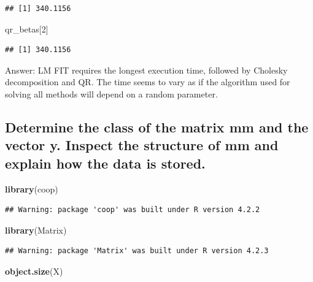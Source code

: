 \documentclass[
]{article}
\newenvironment{Shaded}{\begin{snugshade}}{\end{snugshade}}
\newcommand{\DecValTok}[1]{\textcolor[rgb]{0.00,0.00,0.81}{#1}}
\newcommand{\FunctionTok}[1]{\textcolor[rgb]{0.13,0.29,0.53}{\textbf{#1}}}
\newcommand{\NormalTok}[1]{#1}
\begin{document}
\begin{verbatim}
## [1] 340.1156
\end{verbatim}

\begin{Shaded}
\begin{Highlighting}[]
\NormalTok{qr\_betas[}\DecValTok{2}\NormalTok{]}
\end{Highlighting}
\end{Shaded}

\begin{verbatim}
## [1] 340.1156
\end{verbatim}

Answer: LM FIT requires the longest execution time, followed by Cholesky
decomposition and QR. The time seems to vary as if the algorithm used
for solving all methods will depend on a random parameter.

\subsection{Determine the class of the matrix mm and the vector y.
Inspect the structure of mm and explain how the data is
stored.}\label{determine-the-class-of-the-matrix-mm-and-the-vector-y.-inspect-the-structure-of-mm-and-explain-how-the-data-is-stored.}

\begin{Shaded}
\begin{Highlighting}[]
\FunctionTok{library}\NormalTok{(coop)}
\end{Highlighting}
\end{Shaded}

\begin{verbatim}
## Warning: package 'coop' was built under R version 4.2.2
\end{verbatim}

\begin{Shaded}
\begin{Highlighting}[]
\FunctionTok{library}\NormalTok{(Matrix)}
\end{Highlighting}
\end{Shaded}

\begin{verbatim}
## Warning: package 'Matrix' was built under R version 4.2.3
\end{verbatim}

\begin{Shaded}
\begin{Highlighting}[]
\FunctionTok{object.size}\NormalTok{(X)}
\end{Highlighting}
\end{Shaded}
\end{document}
